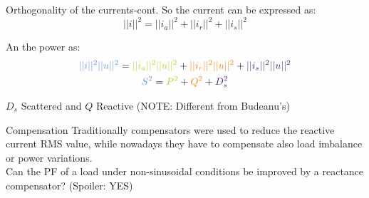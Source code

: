 \documentclass[aspectratio=169]{beamer}
\begin{document}
  \begin{frame}{Orthogonality of the currents-cont.}{\insertsection}
    So the current can be expressed as:
    \begin{equation}
      ||i||^2 = ||i_a||^2 + ||i_r||^2 + ||i_s||^2
    \end{equation}

    \begin{figure}
      \centering
    \end{figure}
    
    An the power as:
    \begin{gather}
      \textcolor{NTNU_blue}{||i||^2||u||^2} =  \textcolor{NTNU_green}{||i_a||^2||u||^2} + \textcolor{NTNU_orange}{||i_r||^2||u||^2}  + \textcolor{NTNU_purple}{||i_s||^2||u||^2}\\
      \textcolor{NTNU_blue}{S^2} = \textcolor{NTNU_green}{P^2} + \textcolor{NTNU_orange}{Q^2} + \textcolor{NTNU_purple}{D_s^2}
    \end{gather}

    \textcolor{NTNU_purple}{$D_s$} Scattered and \textcolor{NTNU_orange}{$Q$} Reactive  (NOTE: Different from Budeanu's)

  \end{frame}

  \begin{frame}{Compensation}{{\insertsection}}
    Traditionally compensators were used to reduce the reactive current RMS value, while nowadays they have to compensate also load imbalance or power variations. \\
    \textcolor{NTNU_orange}{Can the PF of a load under non-sinusoidal conditions be improved by a reactance compensator?} \textcolor{NTNU_purple}{(Spoiler: YES)}
  \end{frame}
\end{document}
